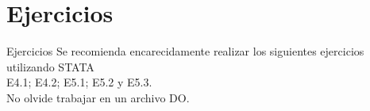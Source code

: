 \section{Ejercicios}

\begin{frame}{Ejercicios}
	Se recomienda encarecidamente realizar los siguientes ejercicios utilizando STATA\\
	E4.1; E4.2; E5.1; E5.2 y E5.3.\\
	No olvide trabajar en un archivo DO.
\end{frame}